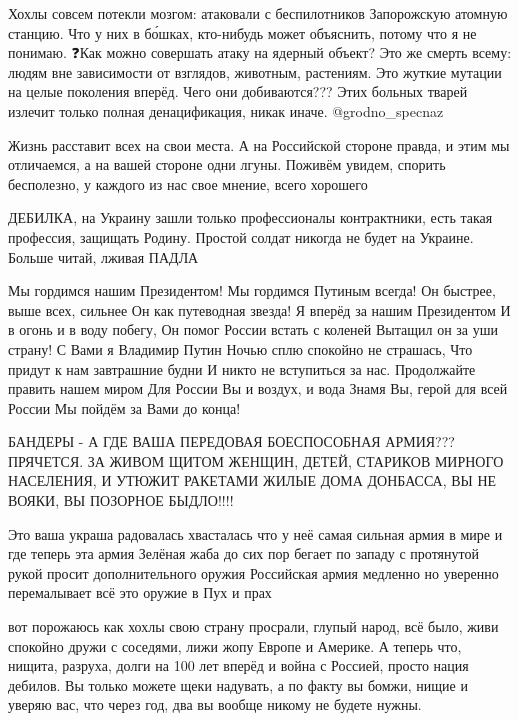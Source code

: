  
 
 
 
 

Хохлы совсем потекли мозгом: атаковали с беспилотников Запорожскую атомную станцию.
Что у них в бо́шках, кто-нибудь может объяснить, потому что я не понимаю.
❓Как можно совершать атаку на ядерный объект? Это же смерть всему: людям вне зависимости от взглядов, животным, растениям. Это жуткие мутации на целые поколения вперёд.
Чего они добиваются???
Этих больных тварей излечит только полная денацификация, никак иначе.
@grodno_specnaz

Жизнь расставит всех на свои места. А на Российской стороне правда, и этим мы
отличаемся, а на вашей стороне одни лгуны. Поживём увидем, спорить бесполезно,
у каждого из нас свое мнение, всего хорошего

ДЕБИЛКА, на Украину зашли только профессионалы контрактники, есть такая профессия, защищать Родину.
Простой солдат никогда не будет на Украине.
Больше читай, лживая ПАДЛА

Мы гордимся нашим Президентом!
Мы гордимся Путиным всегда!
Он быстрее, выше всех, сильнее
Он как путеводная звезда!
Я вперёд за нашим Президентом
И в огонь и в воду побегу,
Он помог России встать с коленей
Вытащил он за уши страну!
С Вами я Владимир Путин
Ночью сплю спокойно не страшась,
Что придут к нам завтрашние будни
И никто не вступиться за нас.
Продолжайте править нашем миром
Для России Вы и воздух, и вода
Знамя Вы, герой для всей России
Мы пойдём за Вами до конца!

БАНДЕРЫ - А ГДЕ ВАША ПЕРЕДОВАЯ БОЕСПОСОБНАЯ АРМИЯ??? ПРЯЧЕТСЯ. ЗА ЖИВОМ ЩИТОМ
ЖЕНЩИН, ДЕТЕЙ, СТАРИКОВ МИРНОГО НАСЕЛЕНИЯ, И УТЮЖИТ РАКЕТАМИ ЖИЛЫЕ ДОМА
ДОНБАССА, ВЫ НЕ ВОЯКИ, ВЫ ПОЗОРНОЕ БЫДЛО!!!!

Это ваша украша радовалась хвасталась что у неё самая сильная армия в мире и
где теперь эта армия Зелёная жаба до сих пор бегает по западу с протянутой
рукой просит дополнительного оружия Российская армия медленно но уверенно
перемалывает всё это оружие в Пух и прах

вот порожаюсь как хохлы свою страну просрали, глупый народ, всё было, живи
спокойно дружи с соседями, лижи жопу Европе и Америке. А теперь что, нищита,
разруха, долги на 100 лет вперёд и война с Россией, просто нация дебилов. Вы
только можете щеки надувать, а по факту вы бомжи, нищие и уверяю вас, что
через год, два вы вообще никому не будете нужны.


